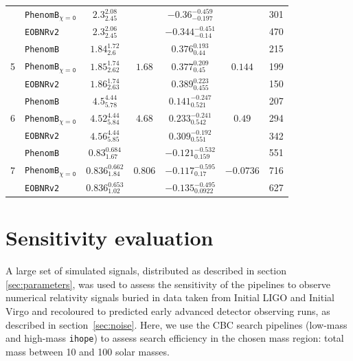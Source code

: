 \documentclass[12pt]{iopart}
\newcommand{\ihope}{\texttt{ihope}}
\newcommand{\eob}{\texttt{EOBNRv2}\xspace}
\newcommand{\imr}{\texttt{PhenomB}\xspace}
\newcommand{\imrns}{\texttt{PhenomB$_\mathtt{\chi=0}$}\xspace}
\begin{document}
\begin{table}
\begin{tabular}{|l|l||c|c||c|c||c|}
& \imrns & $2.3^{2.08}_{2.45}$ & & $-0.36^{-0.459}_{-0.197}$ & & 301 \\
    \cline{2-2}\cline{3-3} \cline{5-5}\cline{7-7}
& \eob & $2.3^{2.06}_{2.45}$ & & $-0.344^{-0.451}_{-0.14}$ & & 470 \\
    \hline \hline
  \multirow{3}{*}{5} & \imr & $1.84^{1.72}_{2.6}$ & \multirow{3}{*}{$1.68$} & 
$0.376^{0.193}_{0.44}$ & \multirow{3}{*}{$0.144$} & 215 \\
    \cline{2-2}\cline{3-3} \cline{5-5}\cline{7-7}
& \imrns & $1.85^{1.74}_{2.62}$ & & $0.377^{0.209}_{0.45}$ & & 199 \\
    \cline{2-2}\cline{3-3} \cline{5-5}\cline{7-7}
& \eob & $1.86^{1.74}_{2.63}$ & & $0.389^{0.223}_{0.455}$ & & 150 \\
    \hline \hline
  \multirow{3}{*}{6} & \imr & $4.5^{4.44}_{5.78}$ & \multirow{3}{*}{$4.68$} & 
$0.141^{-0.247}_{0.521}$ & \multirow{3}{*}{$0.49$} & 207 \\
    \cline{2-2}\cline{3-3} \cline{5-5}\cline{7-7}
& \imrns & $4.52^{4.44}_{5.84}$ & & $0.233^{-0.241}_{0.542}$ & & 294 \\
    \cline{2-2}\cline{3-3} \cline{5-5}\cline{7-7}
& \eob & $4.56^{4.44}_{5.85}$ & & $0.309^{-0.192}_{0.551}$ & & 342 \\
    \hline \hline
  \multirow{3}{*}{7} & \imr & $0.83^{0.684}_{1.67}$ & \multirow{3}{*}{$0.806$} & 
$-0.121^{-0.532}_{0.159}$ & \multirow{3}{*}{$-0.0736$} & 551 \\
    \cline{2-2}\cline{3-3} \cline{5-5}\cline{7-7}
& \imrns & $0.836^{0.662}_{1.84}$ & & $-0.117^{-0.595}_{0.17}$ & & 716 \\
    \cline{2-2}\cline{3-3} \cline{5-5}\cline{7-7}
& \eob & $0.836^{0.653}_{1.02}$ & & $-0.135^{-0.495}_{0.0922}$ & & 627 \\
    \hline 
  \end{tabular}
\end{table}

\section{Sensitivity evaluation}
\label{sec:sensitivity}

A large set of simulated signals, distributed as described in section 
\ref{sec:parameters}, was used to assess the sensitivity of the 
pipelines to observe numerical relativity signals buried in data taken from 
Initial LIGO and Initial Virgo and recoloured to predicted early advanced 
detector observing runs, as described in section~\ref{sec:noise}. Here, we use 
the CBC search 
pipelines (low-mass and high-mass \ihope{}) to assess search 
efficiency in the chosen mass region: total mass between 10 and 
100 solar masses.
\end{document}
